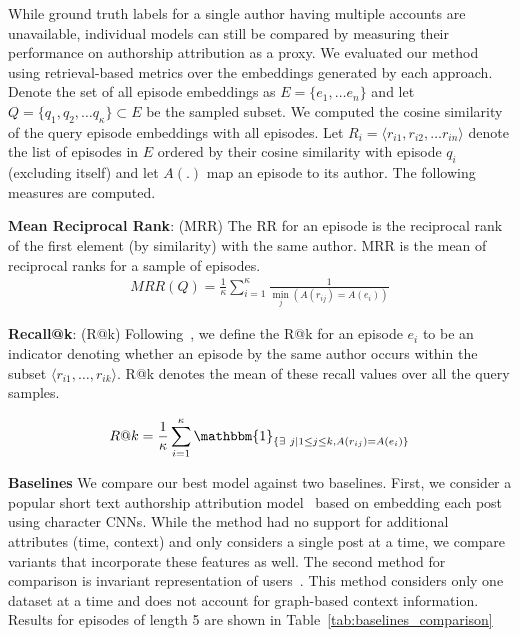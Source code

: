 \label{sec:sysml:eval}
While ground truth labels for a single author having multiple accounts are unavailable, individual models can still be compared by measuring their performance on authorship attribution as a proxy. 
We evaluated our method using retrieval-based metrics over the embeddings generated by each approach. %
Denote the set of all episode embeddings as $E = \{e_1, \dots e_n\}$ and let $Q = \{q_1, q_2, \dots q_\kappa\} \subset E$ be the sampled subset.
We computed the cosine similarity of the query episode embeddings with all episodes. Let $R_i = \langle r_{i1}, r_{i2}, \dots r_{in} \rangle$ denote the list of episodes in $E$ ordered by their cosine similarity with episode $q_i$ (excluding itself) and let $A(.)$ map an episode to its author. The following measures are computed.

\noindent \textbf{Mean Reciprocal Rank}: (MRR) The RR for an episode is the reciprocal rank of the first element (by similarity) with the same author. MRR is the mean of reciprocal ranks for a sample of episodes.
\begin{align*}
    MRR(Q) = \frac{1}{\kappa}\sum_{i=1}^\kappa \frac{1}{\min\limits_j  \left(A(r_{ij}) = A(e_i)\right)}
\end{align*}

\noindent \textbf{Recall@k}:  (R@k)  Following~\citet{andrews2019learning}, we define the R@k for an episode $e_i$ to be an indicator denoting whether an episode by the same author occurs within the subset $ \langle r_{i1}, \dots, r_{ik} \rangle$. R@k denotes the mean of these recall values over all the query samples.

\begin{align*}
    R@k = \frac{1}{\kappa}\sum\limits_{i=1}^{\kappa}{\mathbbm{1}_{\{\exists\ j | 1 \leq j \leq k, A(r_{ij}) = A(e_i)\}}}
\end{align*}

\noindent \textbf{Baselines}
We compare our best model against two baselines. First, we consider a popular short text authorship attribution model~\cite{shrestha2017convolutional} based on embedding each post using character CNNs. 
While the method had no support for additional attributes (time, context) and only considers a single post at a time, we compare variants that incorporate these features as well. 
The second method for comparison is invariant representation of users~\cite{andrews2019learning}. This method considers only one dataset at a time and does not account for graph-based context information. 
Results for episodes of length 5 are shown in Table~\ref{tab:baselines_comparison}

